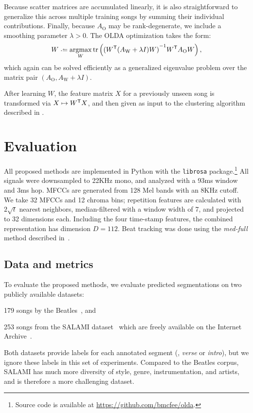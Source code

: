 \documentclass{article}
\begin{document}
Because scatter matrices are accumulated linearly, it is also straightforward to generalize this across multiple training songs
by summing their individual contributions.  Finally, because $A_\text{O}$ may be rank-degenerate, we include a smoothing parameter
$\lambda > 0$.  The OLDA optimization takes the form:
\begin{equation}
W \defeq \argmax_W \trace\left( {(W\trans (A_\text{W} + \lambda I) W)}^{-1} W\trans A_\text{O} W \right) \label{eq:olda},
\end{equation}
which again can be solved efficiently as a generalized eigenvalue problem over the matrix pair 
$(A_\text{O}, A_\text{W} + \lambda I)$.

After learning $W$, the feature matrix $X$ for a previously unseen song is transformed via $X \mapsto W^\mathsf{T} X$, and then 
given as input to the clustering algorithm described in .

\section{Evaluation}
\label{sec:eval}
All proposed methods are implemented in Python with the \texttt{librosa} package.\footnote{Source code is
available at \url{https://github.com/bmcfee/olda}.}  
All signals were downsampled to 22KHz mono, and analyzed with a 93ms window and 3ms hop.  MFCCs are generated from 128 Mel bands
with an 8KHz cutoff. We take 32 MFCCs and 12 chroma bins; repetition features are calculated with $2\sqrt{t}$ nearest neighbors,
median-filtered with a window width of 7, and projected to 32 dimensions each.  Including the four time-stamp features, the combined
representation has dimension $D=112$. Beat tracking was done using the \emph{med-full} method described in~\cite{mcfee2014beat}.

\subsection{Data and metrics}
To evaluate the proposed methods, we evaluate predicted segmentations on two publicly available datasets:
\begin{description}\addtolength{\itemsep}{-0.25\baselineskip}%
\item[Beatles-ISO] 179 songs by the Beatles~\cite{harte2010towards,isophonicsbeatles}, and
\item[SALAMI-free] 253 songs from the SALAMI dataset~\cite{smith2011design} which are freely available on the 
Internet Archive~\cite{nieto2013convex}.
\end{description}
Both datasets provide labels for each annotated segment (\eg, \emph{verse} or \emph{intro}), but we ignore these
labels in this set of experiments. Compared to the Beatles corpus, SALAMI has much more diversity of style, genre, 
instrumentation, and artists, and is therefore a more challenging dataset.
\end{document}
